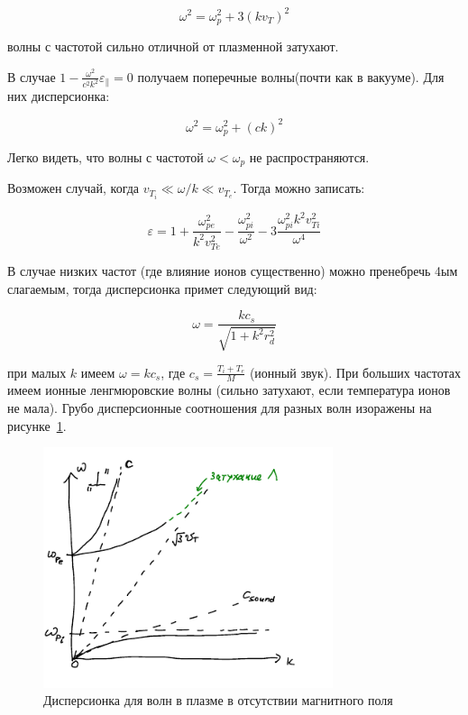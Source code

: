 \documentclass[10pt, a4paper]{article}
\begin{document}
\begin{equation}
    \omega^2=\omega_p^2 + 3 (k v_{T})^2
\end{equation}

волны с частотой сильно отличной от плазменной затухают.

В случае $1 - \frac{\omega^2}{c^2 k^2} \varepsilon_{\parallel}=0$ получаем поперечные волны(почти как в вакууме). Для них
дисперсионка:

\begin{equation}
    \omega^2=\omega_p^2 + (c k)^2
\end{equation}

Легко видеть, что волны с частотой $\omega < \omega_p$ не распространяются.

Возможен случай, когда $v_{T_i} \ll \omega/k \ll v_{T_e}$. Тогда можно записать:

\begin{equation}
    \varepsilon=1+\frac{\omega_{pe}^2}{k^2 v_{Te}^2} - \frac{\omega_{pi}^2}{\omega^2}-3\frac{\omega_{pi}^2 k^2 v_{Ti}^2}{\omega^4}
\end{equation}

В случае низких частот (где влияние ионов существенно) можно пренебречь 4ым слагаемым, тогда дисперсионка примет следующий вид:

\begin{equation}
    \omega=\frac{k c_s}{\sqrt{1 + k^2 r_d^2}}
\end{equation}

при малых $k$ имеем $\omega=k c_s$, где $c_s=\frac{T_i + T_e}{M}$ (ионный звук). При больших частотах имеем ионные ленгмюровские волны (сильно затухают, если температура ионов не мала). Грубо дисперсионные соотношения для разных волн изоражены на рисунке~\ref{fig:disp_eq_without_B}.

\begin{figure}[ht]
	\begin{center}
		\includegraphics[width=85mm]{noB.pdf}
	\end{center}
	\caption{Дисперсионка для волн в плазме в отсутствии магнитного поля}
	\label{fig:disp_eq_without_B} 
\end{figure}
\end{document}

